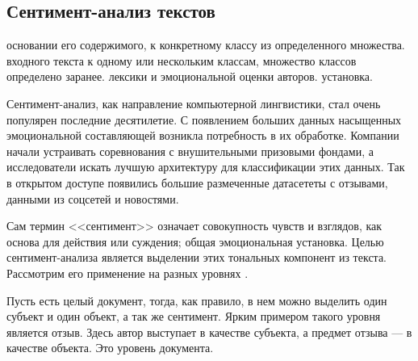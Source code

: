 \subsection{Сентимент\nobreak-анализ текстов}

основании его содержимого, к конкретному классу из определенного множества.
%
входного текста к одному или нескольким классам, множество классов определено заранее.
%
лексики и эмоциональной оценки авторов.
%
установка.

\par
Сентимент-анализ, как направление компьютерной лингвистики, стал очень популярен последние десятилетие. С
появлением больших данных насыщенных эмоциональной составляющей возникла потребность в их обработке. Компании
начали устраивать соревнования с внушительными призовыми фондами, а исследователи искать лучшую архитектуру
для классификации этих данных. Так в открытом доступе появились большие размеченные датасететы с отзывами,
данными из соцсетей и новостями.

\bigskip\par
Сам термин <<сентимент>> означает совокупность чувств и взглядов, как основа для действия или суждения; общая
эмоциональная установка. Целью сентимент-анализа является выделении этих тональных компонент из текста.
Рассмотрим его применение на разных уровнях \cite{Semina}.

\bigskip\par
Пусть есть целый документ, тогда, как правило, в нем можно выделить один субъект и один объект, а так же
сентимент. Ярким примером такого уровня является отзыв. Здесь автор выступает в качестве субъекта, а предмет
отзыва --- в качестве объекта. Это уровень документа.

